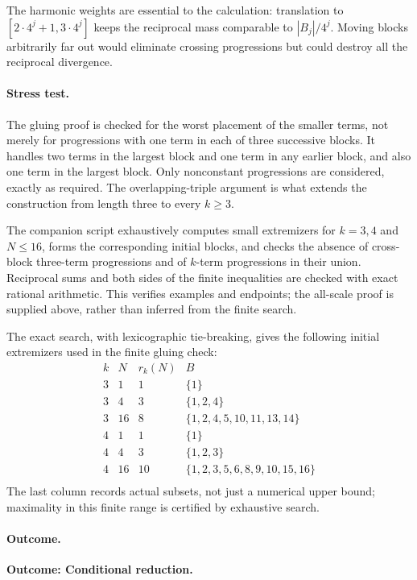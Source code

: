 \documentclass[11pt,a4paper]{article}
\numberwithin{equation}{section}
\begin{document}
The harmonic weights are essential to the calculation: translation to
$[2\cdot4^j+1,3\cdot4^j]$ keeps the reciprocal mass comparable to
$|B_j|/4^j$.  Moving blocks arbitrarily far out would eliminate crossing
progressions but could destroy all the reciprocal divergence.

\paragraph{Stress test.}
The gluing proof is checked for the worst placement of the smaller
terms, not merely for progressions with one term in each of three
successive blocks.  It handles two terms in the largest block and one
term in any earlier block, and also one term in the largest block.
Only nonconstant progressions are considered, exactly as required.
The overlapping-triple argument is what extends the construction from
length three to every $k\geq3$.

The companion script exhaustively computes small extremizers for
$k=3,4$ and $N\leq16$, forms the corresponding initial blocks, and
checks the absence of cross-block three-term progressions and of
$k$-term progressions in their union.  Reciprocal sums and both sides
of the finite inequalities are checked with exact rational arithmetic.
This verifies examples and endpoints; the all-scale proof is supplied
above, rather than inferred from the finite search.

The exact search, with lexicographic tie-breaking, gives the following
initial extremizers used in the finite gluing check:
\[
 \begin{array}{c|r|r|l}
 k&N&r_k(N)&B\\\hline
 3&1&1&\{1\}\\
 3&4&3&\{1,2,4\}\\
 3&16&8&\{1,2,4,5,10,11,13,14\}\\
 4&1&1&\{1\}\\
 4&4&3&\{1,2,3\}\\
 4&16&10&\{1,2,3,5,6,8,9,10,15,16\}\\
 \end{array}
\]
The last column records actual subsets, not just a numerical upper
bound; maximality in this finite range is certified by exhaustive search.

\paragraph{Outcome.}
\textbf{Outcome: Conditional reduction.}
\end{document}

